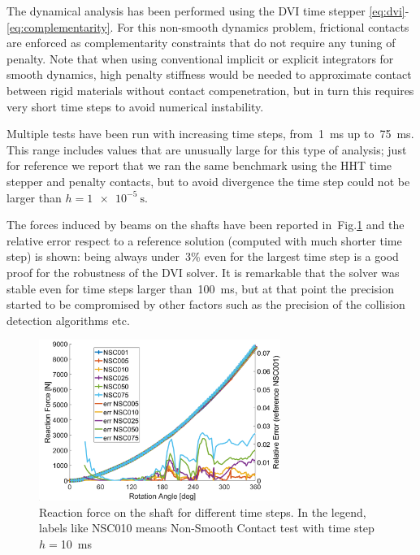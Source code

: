 \documentclass[review]{elsarticle}
\begin{document}
The dynamical analysis has been performed using the DVI time stepper \eqref{eq:dvi}-\eqref{eq:complementarity}. For this non-smooth dynamics problem, frictional contacts are enforced as complementarity constraints that do not require any tuning of penalty. %
Note that when using conventional implicit or explicit integrators for smooth dynamics, high penalty stiffness would be needed to approximate contact between rigid materials without contact compenetration, but in turn this requires very short time steps to avoid numerical instability.

Multiple tests have been run with increasing time steps, from~\SI{1}{\ms} up to~\SI{75}{\ms}. 
This range includes values that are unusually large for this type of analysis; just for reference we report that we ran the same benchmark using the HHT time stepper and penalty contacts, but to avoid divergence the time step could not be larger than $h=\SI{1e-5}{\s}$.

The forces induced by beams on the shafts have been reported in~Fig.\ref{fig:contact_conv} and the relative error respect to a reference solution (computed with much shorter time step) is shown: being always under~\num{3}\% even for the largest time step is a good proof for the robustness of the DVI solver. It is remarkable that the solver was stable even for time steps larger than~\SI{100}{\ms}, but at that point the precision started to be compromised by other factors such as the precision of the collision detection algorithms etc. 

\begin{figure}[ht]
    \centering
    \includegraphics[width=0.7\textwidth]{benchmark_contact/ContactConvWithoutNSC100.png}
    \caption{Reaction force on the shaft for different time steps. In the legend, labels like NSC010 means Non-Smooth Contact test with time step $h=$\SI{10}{\ms} }
    \label{fig:contact_conv}
\end{figure}
\end{document}
